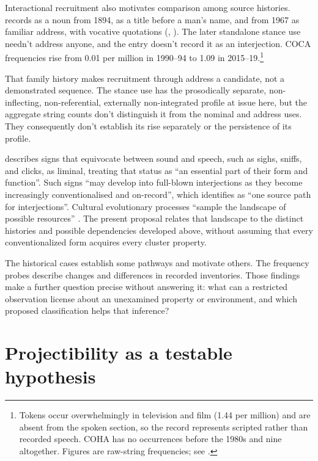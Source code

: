 \documentclass[12pt]{article}
\begin{document}
Interactional recruitment also motivates comparison among source histories. \textcite{oed_bruh} records  as a noun from 1894, as a title before a man's name, and from 1967 as familiar address, with vocative quotations (, ). The later standalone stance use needn't address anyone, and the entry doesn't record it as an interjection. COCA frequencies rise from 0.01 per million in 1990--94 to 1.09 in 2015--19.\footnote{Tokens occur overwhelmingly in television and film (1.44 per million) and are absent from the spoken section, so the record represents scripted rather than recorded speech. COHA has no occurrences before the 1980s and nine altogether. Figures are raw-string frequencies; see .}

That family history makes recruitment through address a candidate, not a demonstrated sequence. The stance use has the prosodically separate, non-inflecting, non-referential, externally non-integrated profile at issue here, but the aggregate string counts don't distinguish it from the nominal and address uses. They consequently don't establish its rise separately or the persistence of its profile.

\textcite[191]{dingemanse2020} describes signs that equivocate between sound and speech, such as sighs, sniffs, and clicks, as liminal, treating that status as \enquote{an essential part of their form and function}. Such signs \enquote{may develop into full-blown interjections as they become increasingly conventionalised and on-record}, which \textcite[12]{dingemanse2023preprint} identifies as \enquote{one source path for interjections}. Cultural evolutionary processes \enquote{sample the landscape of possible resources} \citep[191]{dingemanse2020}. The present proposal relates that landscape to the distinct histories and possible dependencies developed above, without assuming that every conventionalized form acquires every cluster property.

The historical cases establish some pathways and motivate others. The frequency probes describe changes and differences in recorded inventories. Those findings make a further question precise without answering it: what can a restricted observation license about an unexamined property or environment, and which proposed classification helps that inference?

\section[Projectibility]{Projectibility as a testable hypothesis}\label{sec:projectibility}
\end{document}
